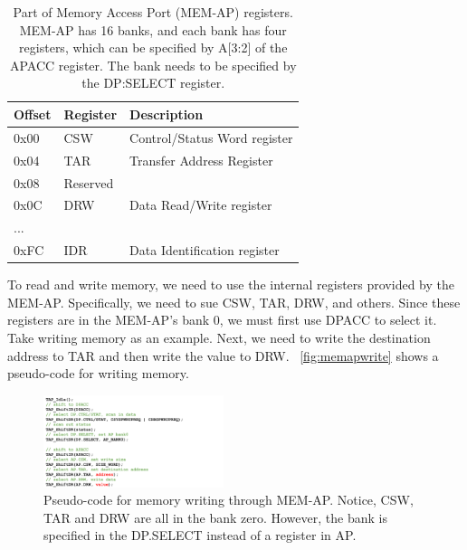 \begin{center}
	\begin{table}
		\begin{tabular}{l l l} 
			\hline
			Offset & Register &  Description  \\ 
			\hline
			0x00 & CSW & Control/Status Word register \\
			\hline
			0x04 & TAR & Transfer Address Register \\
			\hline
			0x08 & \multicolumn{2}{l}{Reserved} \\
			\hline
			0x0C & DRW & Data Read/Write register\\
			\hline
			... & & \\
			\hline
			0xFC & IDR & Data Identification register\\
			\hline
		\end{tabular}
		\caption{Part of Memory Access Port (MEM-AP) registers. MEM-AP has 16 banks, and each bank has four registers, which can be specified by A[3:2] of the APACC register. The bank needs to be specified by the DP:SELECT register.}
		\label{tab:memapreg}
	\end{table}
\end{center}





To read and write memory, we need to use the internal registers provided by the MEM-AP. Specifically, we need to sue CSW, TAR, DRW, and others. Since these registers are in the MEM-AP's bank 0, we must first use DPACC to select it. Take writing memory as an example. Next, we need to write the destination address to TAR and then write the value to DRW. ~\autoref{fig:memapwrite} shows a pseudo-code for writing memory.


\begin{figure}[ht]
	\includegraphics[width=0.47\textwidth]{figures/memapwrite2}
	\centering
	\caption{Pseudo-code for memory writing through MEM-AP. Notice, CSW, TAR and DRW are all in the bank zero. However, the bank is specified in the DP.SELECT instead of a register in AP.}
	\label{fig:memapwrite}
\end{figure}




